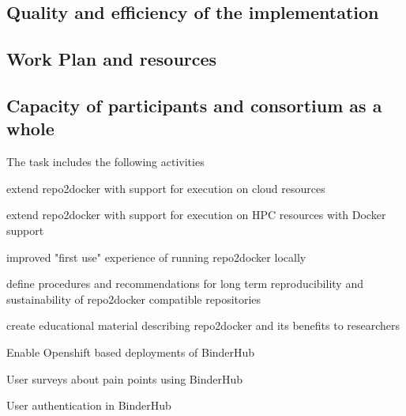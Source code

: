 \documentclass[
  deliverables,
  longtasklabels,
  numericcites,
  noworkareas,
  svgnames,
  \classoptions
]{euproposal}       %
\begin{document}
\begin{proposal}
\section{Quality and efficiency of the implementation}

\subsection{Work Plan and resources}

\label{sect:workplan}

\newpage

% 

\draftpage
\subsection{Capacity of participants and consortium as a whole}

\draftpage


\end{proposal}

\begin{draft}


  The task includes the following activities
  \begin{compactitem}
  \item extend repo2docker with support for execution on cloud resources
  \item extend repo2docker with support for execution on HPC resources with Docker support
  \item improved "first use" experience of running repo2docker locally
  \item define procedures and recommendations for long term reproducibility and sustainability of repo2docker compatible repositories
  \item create educational material describing repo2docker and its benefits to researchers
  \item Enable Openshift based deployments of BinderHub
  \item User surveys about pain points using BinderHub
  \item User authentication in BinderHub
  \end{compactitem}
  \end{draft}
\end{document}
